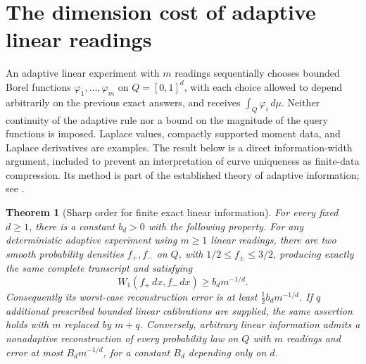 \documentclass[11pt,letterpaper]{article}
\newtheorem{theorem}{Theorem}[section]
\theoremstyle{definition}
\theoremstyle{remark}
\newcommand{\1}{\mathbf 1}
\begin{document}
\section{The dimension cost of adaptive linear readings}
\label{p08:sec:information-barriers}

An adaptive linear experiment with $m$ readings sequentially chooses bounded
Borel functions $\varphi_1,\ldots,\varphi_m$ on $Q=[0,1]^d$, with each
choice allowed to depend arbitrarily on the previous exact answers, and
receives $\int_Q\varphi_i\,d\mu$.  Neither continuity of the adaptive rule
nor a bound on the magnitude of the query functions is imposed.  Laplace
values, compactly supported moment data, and Laplace derivatives are examples.
The result below is a direct information-width argument, included to prevent
an interpretation of curve uniqueness as finite-data compression.  Its
method is part of the established theory of adaptive information; see
\cite{KriegNovakUllrich2025}.

\begin{theorem}[Sharp order for finite exact linear information]
\label{p08:thm:adaptive-linear-w1}
For every fixed $d\geq1$, there is a constant $b_d>0$ with the following
property.  For any deterministic adaptive experiment using $m\geq1$ linear
readings, there are two smooth probability densities $f_+,f_-$ on $Q$, with
$1/2\leq f_\pm\leq3/2$, producing exactly the same complete transcript and
satisfying
\begin{equation}\label{p08:eq:adaptive-w1-lower}
 W_1(f_+\,dx,f_-\,dx)\geq b_d m^{-1/d}.
\end{equation}
Consequently its worst-case reconstruction error is at least
$\tfrac12b_dm^{-1/d}$.  If $q$ additional prescribed bounded linear
calibrations are supplied, the same assertion holds with $m$ replaced by
$m+q$.  Conversely, arbitrary linear information admits a nonadaptive
reconstruction of every probability law on $Q$ with $m$ readings and error
at most $B_d m^{-1/d}$, for a constant $B_d$ depending only on $d$.
\end{theorem}
\end{document}
